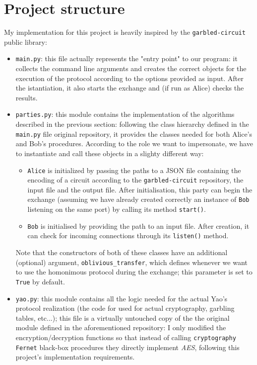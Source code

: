 \documentclass[12pt]{article}
\begin{document}
\section{Project structure}
My implementation for this project is heavily inspired by the \texttt{garbled-circuit} \cite{GARBLED} public library:

\begin{itemize}
  \item \texttt{main.py}: this file actually represents the "entry point" to our program: it collects the command line arguments and creates the correct objects for the execution of the protocol according to the options provided as input. After the istantiation, it also starts the exchange and (if run as Alice) checks the results.
  \item \texttt{parties.py}: this module contains the implementation of the algorithms described in the previous section: following the class hierarchy defined in the \texttt{main.py} file original repository, it provides the classes needed for both Alice's and Bob's procedures. According to the role we want to impersonate, we have to instantiate and call these objects in a slighty different way:
  \begin{itemize}
    \item \texttt{Alice} is initialized by passing the paths to a JSON file containing the encoding of a circuit according to the \texttt{garbled-circuit} repository, the input file and the output file. After initialisation, this party can begin the exchange (assuming we have already created correctly an instance of \texttt{Bob} listening on the same port) by calling its method \texttt{start()}.
    \item \texttt{Bob} is initialised by providing the path to an input file. After creation, it can check for incoming connections through its \texttt{listen()} method.
  \end{itemize}
  Note that the constructors of both of these classes have an additional (optional) argument, \texttt{oblivious\_transfer}, which defines whenever we want to use the homonimous protocol during the exchange; this parameter is set to \texttt{True} by default.
  \item \texttt{yao.py}: this module contains all the logic needed for the actual Yao's protocol realization (the code for used for actual cryptography, garbling tables, etc...); this file is a virtually untouched copy of the the original module defined in the aforementioned repository: I only modified the encryption/decryption functions so that instead of calling \texttt{cryptography} \cite{CRYPTO} \texttt{Fernet} black-box procedures they directly implement \textit{AES}, following this project's implementation requirements.

\end{itemize}
\end{document}
